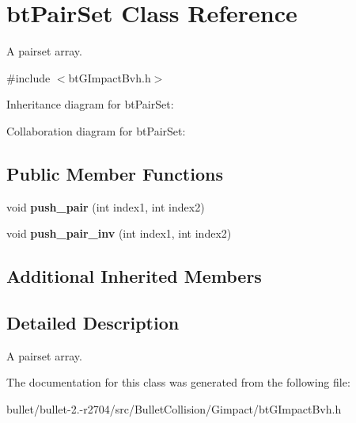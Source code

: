 \hypertarget{classbt_pair_set}{\section{bt\+Pair\+Set Class Reference}
\label{classbt_pair_set}
}


A pairset array.  




{\ttfamily \#include $<$bt\+G\+Impact\+Bvh.\+h$>$}



Inheritance diagram for bt\+Pair\+Set\+:


Collaboration diagram for bt\+Pair\+Set\+:
\subsection*{Public Member Functions}
\begin{DoxyCompactItemize}
\item 
\hypertarget{classbt_pair_set_a61b9bfd0a47a379aa6b7f9e974f19d2a}{void {\bfseries push\+\_\+pair} (int index1, int index2)}\label{classbt_pair_set_a61b9bfd0a47a379aa6b7f9e974f19d2a}

\item 
\hypertarget{classbt_pair_set_aa3f37eeb8fd290b38cea34a79fd37cd5}{void {\bfseries push\+\_\+pair\+\_\+inv} (int index1, int index2)}\label{classbt_pair_set_aa3f37eeb8fd290b38cea34a79fd37cd5}

\end{DoxyCompactItemize}
\subsection*{Additional Inherited Members}


\subsection{Detailed Description}
A pairset array. 

The documentation for this class was generated from the following file\+:\begin{DoxyCompactItemize}
\item 
bullet/bullet-\/2.-\/r2704/src/\+Bullet\+Collision/\+Gimpact/bt\+G\+Impact\+Bvh.\+h\end{DoxyCompactItemize}
